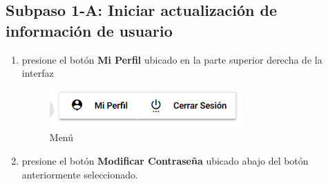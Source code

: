 \subsection{Subpaso 1-A: Iniciar actualización de información de usuario}
\begin{enumerate}
	\item presione el botón \textbf{Mi Perfil} ubicado en la parte 
		superior derecha de la interfaz
	\begin{figure}[hbt]
			\includegraphics[scale=0.7]{images/Interfaz/IUGS01_menuadmin.png}
		\caption{Menú}
	\end{figure}
	\item presione el botón \textbf{Modificar Contraseña} ubicado abajo del botón anteriormente seleccionado. 
	
\end{enumerate}

	